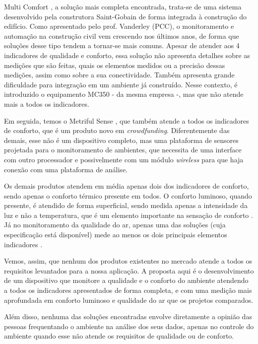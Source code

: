 \documentclass[../monografia.tex]{subfiles}
\begin{document}
Multi Comfort \cite{multicomfort}, a solução mais completa encontrada, trata-se de uma sistema desenvolvido pela construtora Saint-Gobain de forma integrada à construção do edifício. Como apresentado pelo prof. Vanderley (PCC), o monitoramento e automação na construção civil vem crescendo nos últimos anos, de forma que soluções desse tipo tendem a tornar-se mais comuns. 
Apesar de atender aos 4 indicadores de qualidade e conforto, essa solução não apresenta detalhes sobre as medições que são feitas, quais os elementos medidos ou a precisão dessas medições, assim como sobre a sua conectividade. Também apresenta grande dificuldade para integração em um ambiente já construído. Nesse contexto, é introduzido o equipamento MC350\cite{mc350} - da mesma empresa -, mas que não atende mais a todos os indicadores. 

Em seguida, temos o Metriful Sense \cite{metriful}, que também atende a todos os indicadores de conforto, que é um produto novo em \textit{crowdfunding}. Diferentemente das demais, esse não é um dispositivo completo, mas uma plataforma de sensores projetada para o monitoramento de ambientes, que necessita de uma interface com outro processador e possivelmente com um módulo \textit{wireless} para que haja conexão com uma plataforma de análise. 

Os demais produtos atendem em média apenas dois dos indicadores de conforto, sendo apenas o conforto térmico presente em todos. O conforto luminoso, quando presente, é atendido de forma superficial, sendo medida apenas a intensidade da luz e não a temperatura, que é um elemento importante na sensação de conforto \cite{VisualComfort}. Já no monitoramento da qualidade do ar, apenas uma das soluções \cite{ECOMLITE} (cuja especificação está disponível) mede ao menos os dois principais elementos indicadores \cite{AirQuality}. 

Vemos, assim, que nenhum dos produtos existentes no mercado atende a todos os requisitos levantados para a nossa aplicação. A proposta aqui é o desenvolvimento de um dispositivo que monitore a qualidade e o conforto do ambiente atendendo a todos os indicadores apresentados de forma completa, e com uma medição mais aprofundada em conforto luminoso e qualidade do ar que os projetos comparados. 

Além disso, nenhuma das soluções encontradas envolve diretamente a opinião das pessoas frequentando o ambiente na análise dos seus dados, apenas no controle do ambiente quando esse não atende os requisitos de qualidade ou de conforto. 
\end{document}
